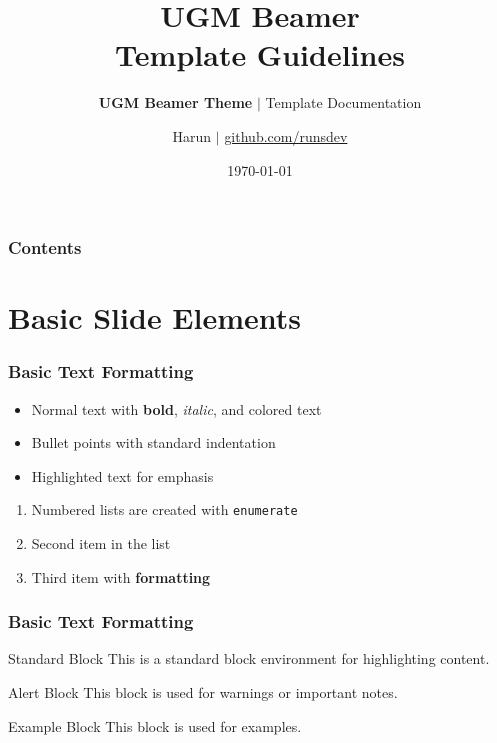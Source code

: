 \documentclass[aspectratio=169,professionalfonts]{beamer}
\title{UGM Beamer \\Template Guidelines}
\subtitle{\textbf{UGM Beamer Theme} $|$ Template Documentation}
\author{Harun $|$ {\href{https://github.com/runsdev}{github.com/runsdev}}}
\date{\today}
\begin{document}
\begin{frame}[plain]
    \titlepage
\end{frame}

\begin{frame}
    \frametitle{Contents}
    
    \begin{multicols}{2}
        \tableofcontents
    \end{multicols}
\end{frame}

\section{Basic Slide Elements}

\begin{frame}
    \frametitle{Basic Text Formatting}
    
    \begin{itemize}
        \item Normal text with \textbf{bold}, \textit{italic}, and \textcolor{ugmBlue}{colored text}
        \item Bullet points with standard indentation
        \item \alert{Highlighted text} for emphasis
    \end{itemize}
    
    \begin{enumerate}
        \item Numbered lists are created with \texttt{enumerate}
        \item Second item in the list
        \item Third item with \textbf{formatting}
    \end{enumerate}
\end{frame}

\begin{frame}
    \frametitle{Basic Text Formatting}
    
    \begin{block}{Standard Block}
        This is a standard block environment for highlighting content.
    \end{block}
    
    \begin{alertblock}{Alert Block}
        This block is used for warnings or important notes.
    \end{alertblock}
    
    \begin{exampleblock}{Example Block}
        This block is used for examples.
    \end{exampleblock}
\end{frame}
\end{document}
